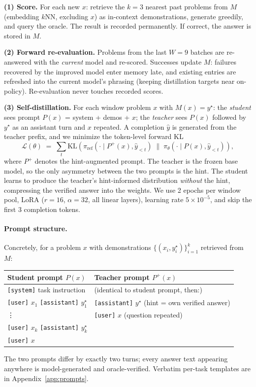 \textbf{(1) Score.} For each new $x$: retrieve the $k{=}3$ nearest past problems
from $M$ (embedding $k$NN, excluding $x$) as in-context demonstrations, generate
greedily, and query the oracle. The result is recorded permanently. If correct, the answer is stored in $M$.

\textbf{(2) Forward re-evaluation.} Problems from the last $W{=}9$ batches are
re-answered with the \emph{current} model and re-scored. Successes update $M$:
failures recovered by the improved model enter memory late, and existing entries
are refreshed into the current model's phrasing (keeping distillation targets
near on-policy). Re-evaluation never touches recorded scores.

\textbf{(3) Self-distillation.} For each window problem $x$ with $M(x) = y^\star$:
the \emph{student} sees prompt $P(x)$ = system + demos + $x$; the \emph{teacher}
sees $P(x)$ followed by $y^\star$ as an assistant turn and $x$ repeated. A
completion $\hat y$ is generated from the teacher prefix, and we minimize the
token-level forward KL
\begin{equation}
\mathcal{L}(\theta) \;=\; \sum_t \mathrm{KL}\!\left(
  \pi_{\text{ref}}(\cdot \mid P^{+}(x), \hat y_{<t}) \;\big\|\;
  \pi_\theta(\cdot \mid P(x), \hat y_{<t}) \right),
\label{eq:kl}
\end{equation}
where $P^{+}$ denotes the hint-augmented prompt. The teacher is the frozen base model, so the only asymmetry between the two
prompts is the hint. The student learns to produce the
teacher's hint-informed distribution \emph{without} the hint, compressing the
verified answer into the weights. We use 2 epochs per window pool, LoRA
($r{=}16$, $\alpha{=}32$, all linear layers), learning rate $5{\times}10^{-5}$,
and skip the first 3 completion tokens.

\paragraph{Prompt structure.} Concretely, for a problem $x$ with demonstrations
$\{(x_i, y_i^\star)\}_{i=1}^{k}$ retrieved from $M$:
\begin{center}
\small
\begin{tabular}{ll}
\toprule
\textbf{Student prompt} $P(x)$ & \textbf{Teacher prompt} $P^{+}(x)$ \\
\midrule
\texttt{[system]} task instruction & (identical to student prompt, then:) \\
\texttt{[user]} $x_1$ \quad \texttt{[assistant]} $y_1^\star$ & \texttt{[assistant]} $y^\star$ \;(hint = own verified answer) \\
\;\;\vdots & \texttt{[user]} $x$ \;(question repeated) \\
\texttt{[user]} $x_k$ \quad \texttt{[assistant]} $y_k^\star$ & \\
\texttt{[user]} $x$ & \\
\bottomrule
\end{tabular}
\end{center}
The two prompts differ by exactly two turns; every answer text appearing anywhere
is model-generated and oracle-verified. Verbatim per-task templates are in
Appendix~\ref{app:prompts}.

